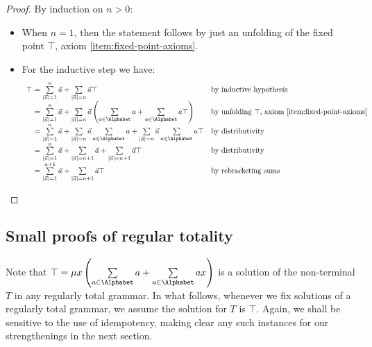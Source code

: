 \begin{proof}
    By induction on $n>0$:
    \begin{itemize}
        \item When $n=1$, then the statement follows by just an unfolding of the fixed point $\top$, axiom \eqref{item:fixed-point-axioms}.
        \item For the inductive step we have:
        \[
        \begin{array}{r@{\ = \ }ll}
             \top & \sum\limits_{|\vec a|=1}^{n}\vec a + \sum\limits_{|\vec a|= n} \vec a \top & \text{by inductive hypothesis} \\
                & \sum\limits_{|\vec a|=1}^{n}\vec a + \sum\limits_{|\vec a|= n} \vec a \left(\sum\limits_{a \in \Alphabet} a + \sum\limits_{a\in \Alphabet} a\top \right) & \text{by unfolding $\top$, axiom \eqref{item:fixed-point-axioms}} \\
                & \sum\limits_{|\vec a|=1}^{n}\vec a + \sum\limits_{|\vec a|= n} \vec a \sum\limits_{a \in \Alphabet} a + \sum\limits_{|\vec a|= n} \vec a\sum\limits_{a\in \Alphabet} a\top & \text{by distributivity} \\
                & \sum\limits_{|\vec a|=1}^{n}\vec a + \sum\limits_{|\vec a|= n+1} \vec a + \sum\limits_{|\vec a|= n+1} \vec a\top & \text{by distributivity} \\
                & \sum\limits_{|\vec a|=1}^{n+1}\vec a + \sum\limits_{|\vec a|= n+1} \vec a\top & \text{by rebracketing sums} \qedhere
        \end{array}
        \]
    \end{itemize}
\end{proof}

\subsection{Small proofs of regular totality}

Note that $\top =\mu x \left(\sum\limits_{a \in \Alphabet} a + \sum\limits_{a\in \Alphabet} ax \right)$ is a solution of the non-terminal $T$ in any regularly total grammar.
In what follows, whenever we fix solutions of a regularly total grammar, we assume the solution for $T$ is $\top$.
Again, we shall be sensitive to the use of idempotency, making clear any such instances for our strengthenings in the next section.

